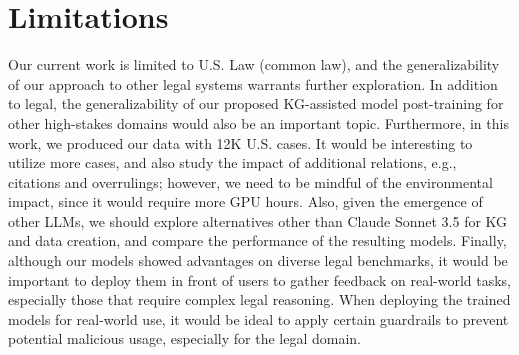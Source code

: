 \section*{Limitations}
\label{section:limitation}

Our current work is limited to U.S. Law (common law), and the generalizability of our approach to other legal systems warrants further exploration. In addition to legal, the generalizability of our proposed KG-assisted model post-training for other high-stakes domains would also be an important topic. Furthermore, in this work, we produced our data with 12K U.S. cases. It would be interesting to utilize more cases, and also study the impact of additional relations, e.g., citations and overrulings; however, we need to be mindful of the environmental impact, since it would require more GPU hours. Also, given the emergence of other LLMs, we should explore alternatives other than Claude Sonnet 3.5 for KG and data creation, and compare the performance of the resulting models. Finally, although our models showed advantages on diverse legal benchmarks, it would be important to deploy them in front of users to gather feedback on real-world tasks, especially those that require complex legal reasoning. When deploying the trained models for real-world use, it would be ideal to apply certain guardrails to prevent potential malicious usage, especially for the legal domain.